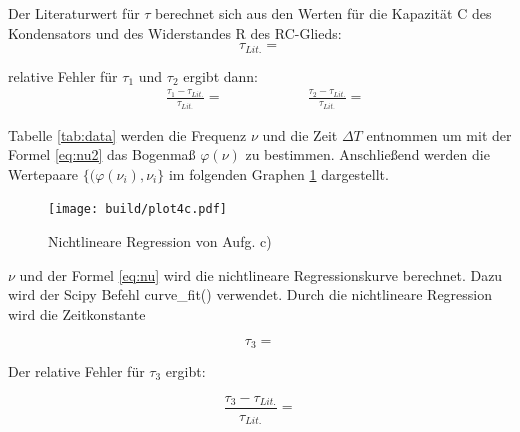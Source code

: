    \justifying  
  Der Literaturwert für $\tau$ berechnet sich aus den Werten für die Kapazität C des Kondensators und 
  des Widerstandes R des RC-Glieds:
  \begin{equation}
  \tau_{Lit.} = \text{} \label{eq:tauL}
  \end{equation}

   \justifying relative Fehler für $\tau_1$ und $\tau_2$ ergibt dann:
  \begin{align}\label{eq:tau1_2}
    &\frac{\tau_1-\tau_{Lit.}}{\tau_{Lit.}}=\phantom{-}\text{} \qquad \qquad
    &\frac{\tau_2-\tau_{Lit.}}{\tau_{Lit.}}=\text{}
  \end{align}


   \justifying Tabelle \ref{tab:data} werden die Frequenz $\nu$ 
  und die Zeit $\Delta T$ entnommen um mit der Formel \eqref{eq:nu2} das 
  Bogenmaß $\varphi (\nu)$ zu bestimmen. Anschließend werden die Wertepaare $\{(\varphi(\nu_i), 
  \nu_i\}$ im folgenden Graphen \ref{fig:4c} dargestellt.

  \begin{figure}[H]
    \texttt{[image: build/plot4c.pdf]}
    \centering
    \caption{Nichtlineare Regression von Aufg. c)}
    \label{fig:4c}
  \end{figure}

  \newpage
   \justifying $\nu$ und der Formel \eqref{eq:nu} wird die nichtlineare Regressionskurve berechnet. Dazu wird der Scipy Befehl curve\_fit() 
  \cite{scipy} verwendet. Durch die nichtlineare Regression wird die Zeitkonstante
 
  \begin{equation}
  \tau_3 = \text{}
  \end{equation}

   \justifying Der relative Fehler für $\tau_3$ ergibt:

  \begin{equation}
  \frac{\tau_3-\tau_{Lit.}}{\tau_{Lit.}}=\text{}
  \end{equation}


